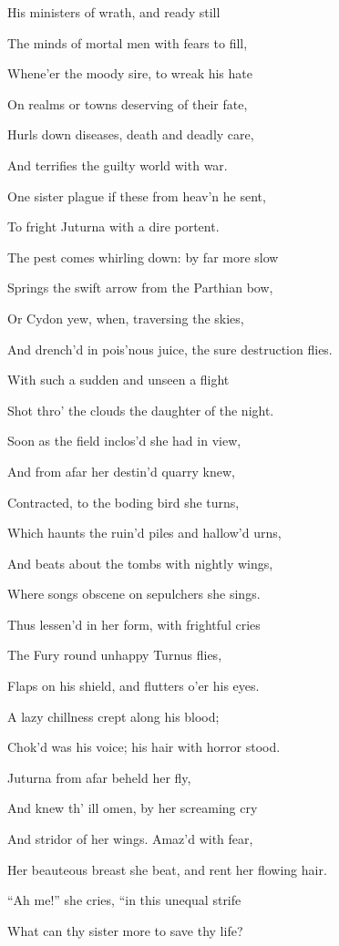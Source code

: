His ministers of wrath, and ready still

The minds of mortal men with fears to fill,

Whene’er the moody sire, to wreak his hate

On realms or towns deserving of their fate,

Hurls down diseases, death and deadly care,

And terrifies the guilty world with war.

One sister plague if these from heav’n he sent,

To fright Juturna with a dire portent.

The pest comes whirling down: by far more slow

Springs the swift arrow from the Parthian bow,

Or Cydon yew, when, traversing the skies,

And drench’d in pois’nous juice, the sure destruction flies.

With such a sudden and unseen a flight

Shot thro’ the clouds the daughter of the night.

Soon as the field inclos’d she had in view,

And from afar her destin’d quarry knew,

Contracted, to the boding bird she turns,

Which haunts the ruin’d piles and hallow’d urns,

And beats about the tombs with nightly wings,

Where songs obscene on sepulchers she sings.

Thus lessen’d in her form, with frightful cries

The Fury round unhappy Turnus flies,

Flaps on his shield, and flutters o’er his eyes.

A lazy chillness crept along his blood;

Chok’d was his voice; his hair with horror stood.

Juturna from afar beheld her fly,

And knew th’ ill omen, by her screaming cry

And stridor of her wings. Amaz’d with fear,

Her beauteous breast she beat, and rent her flowing hair.

“Ah me!” she cries, “in this unequal strife

What can thy sister more to save thy life?

